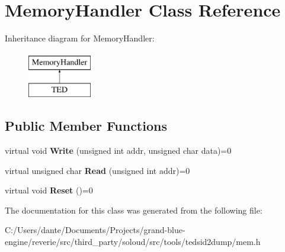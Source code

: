 \hypertarget{class_memory_handler}{}\section{Memory\+Handler Class Reference}
\label{class_memory_handler}
Inheritance diagram for Memory\+Handler\+:\begin{figure}[H]
\begin{center}
\leavevmode
\includegraphics[height=2.000000cm]{class_memory_handler}
\end{center}
\end{figure}
\subsection*{Public Member Functions}
\begin{DoxyCompactItemize}
\item 
\mbox{\label{class_memory_handler_aa76679be92fbb79ab13177a257a33054}} 
virtual void {\bfseries Write} (unsigned int addr, unsigned char data)=0
\item 
\mbox{\label{class_memory_handler_a651313cdb02f6cda064e7e4a749cb72e}} 
virtual unsigned char {\bfseries Read} (unsigned int addr)=0
\item 
\mbox{\label{class_memory_handler_a29dfafcb8661e14b850d0059a5efbf29}} 
virtual void {\bfseries Reset} ()=0
\end{DoxyCompactItemize}


The documentation for this class was generated from the following file\+:\begin{DoxyCompactItemize}
\item 
C\+:/\+Users/dante/\+Documents/\+Projects/grand-\/blue-\/engine/reverie/src/third\+\_\+party/soloud/src/tools/tedsid2dump/mem.\+h\end{DoxyCompactItemize}
